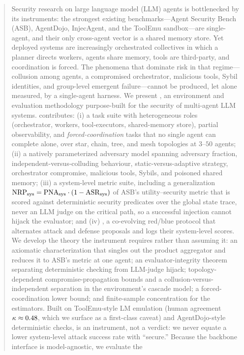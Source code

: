 \begin{abstract}
Security research on large language model (LLM) agents is bottlenecked by its
instruments: the strongest existing benchmarks---Agent Security Bench (ASB),
AgentDojo, InjecAgent, and the ToolEmu sandbox---are single-agent, and their only
cross-agent vector is a shared memory store. Yet deployed systems are increasingly
orchestrated collectives in which a planner directs workers, agents share memory,
tools are third-party, and coordination is forced. The phenomena that dominate risk
in that regime---collusion among agents, a compromised orchestrator, malicious
tools, Sybil identities, and group-level emergent failure---cannot be produced, let
alone measured, by a single-agent harness. We present , an environment and
evaluation methodology purpose-built for the security of multi-agent LLM systems.
 contributes: (i) a task suite with heterogeneous roles (orchestrator,
workers, tool-executors, shared-memory store), partial observability, and
\emph{forced-coordination} tasks that no single agent can complete alone, over star,
chain, tree, and mesh topologies at $3$--$50$ agents; (ii) a natively parameterized
adversary model spanning adversary fraction, independent-versus-colluding behaviour,
static-versus-adaptive strategy, orchestrator compromise, malicious tools, Sybils,
and poisoned shared memory; (iii) a system-level metric suite, including a
generalization $\NRPs=\PNAs\cdot(1-\ASRs)$ of ASB's utility--security metric that is
scored against deterministic security predicates over the global state trace, never
an LLM judge on the critical path, so a successful injection cannot hijack the
evaluator; and (iv) \corb, a co-evolving red/blue protocol that alternates attack and
defense proposals and logs their system-level scores. We develop the theory the
instrument requires rather than assuming it: an axiomatic characterization that
singles out the product aggregator and reduces it to ASB's metric at one agent;
an evaluator-integrity theorem separating deterministic checking from LLM-judge
hijack; topology-dependent compromise-propagation bounds and a
collusion-versus-independent separation in the environment's cascade model; a
forced-coordination lower bound; and finite-sample concentration for the estimators.
Built on ToolEmu-style LM emulation (human agreement $\kappaem\approx 0.48$, which we
surface as a first-class caveat) and AgentDojo-style deterministic checks, 
is an instrument, not a verdict: we never equate a lower system-level attack success
rate with ``secure.'' Because the backbone interface is model-agnostic, we evaluate the

\end{abstract}
